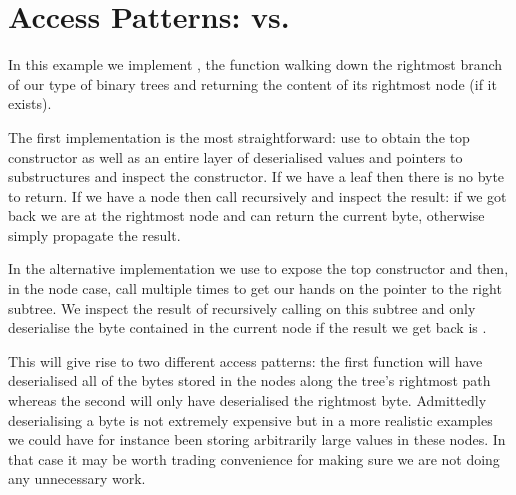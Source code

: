 \section{Access Patterns:  vs. }\label{appendix:rightmost}

In this example we implement , the function walking
down the rightmost branch of our type of binary trees and returning the
content of its rightmost node (if it exists).

The first implementation is the most straightforward: use 
to obtain the top constructor as well as an entire layer of deserialised values
and pointers to substructures and inspect the constructor.
%
If we have a leaf then there is no byte to return.
%
If we have a node then call  recursively and inspect the
result: if we got  back we are at the rightmost node and can
return the current byte, otherwise simply propagate the result.


In the alternative implementation we use  to expose the top
constructor and then, in the node case, call  multiple times
to get our hands on the pointer to the right subtree.
%
We inspect the result of recursively calling  on this
subtree and only deserialise the byte contained in the current node if the result
we get back is .


This will give rise to two different access patterns: the first function will
have deserialised all of the bytes stored in the nodes along the tree's
rightmost path whereas the second will only have deserialised the rightmost byte.
%
Admittedly deserialising a byte is not extremely expensive but in a more realistic
examples we could have for instance been storing arbitrarily large values in
these nodes. In that case it may be worth trading convenience for making sure we
are not doing any unnecessary work.
